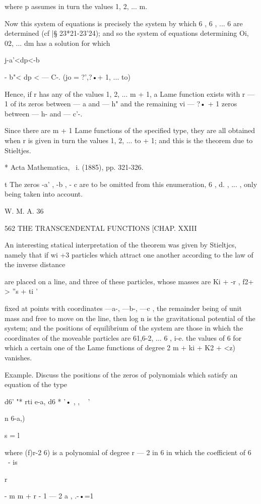 {{{{{{{where p assumes in turn the values 1, 2, ... m.

Now this system of equations is precisely the system by which 6 , 6 ,
... 6 are determined (cf |§ 23*21-23'24); and so the system of
equations determining Oi, 02, ... dm has a solution for which

j-a'<dp<-b%

 - b"< dp < — C-. (jo = ?',?•+ 1, ... to)

Hence, if r has any of the values 1, 2, ... m + 1, a Lame function
exists with r — 1 of its zeros between — a and — h" and the remaining
vi — ?• + 1 zeros between — h- and — c'-.

Since there are m + 1 Lame functions of the specified type, they are
all obtained when r is given in turn the values 1, 2, ... to + 1; and
this is the theorem due to Stieltjes.

* Acta Mathematica, \ i. (1885), pp. 321-326.

t The zeros -a' , -b , - c are to be omitted from this enumeration, 6
, d. , ... , only being taken into account.

W. M. A. 36

562 THE TRANSCENDENTAL FUNCTIONS [CHAP. XXIII

An interesting statical interpretation of the theorem was given by
Stieltjcs, namely that if wi +3 particles which attract one another
according to the law of the inverse distance

are placed on a line, and three of these particles, whose masses are
Ki + -r , f2+ > ''s + ti '

fixed at points with coordinates —a-, —b-, —c , the remainder being of
unit mass and free to move on the line, then log n is the
gravitational potential of the system; and the positions of
equilibrium of the system are those in which the coordinates of the
moveable particles are 61,6-2, ... 6 , i-e. the values of 6 for which
a certain one of the Lame functions of degree 2 m + ki + K2 + <z)
vanishes.

Example. Discuss the positions of the zeros of polynomials which
satisfy an equation of the type

d6' "* rti e-a, d6 * '• , , ~ '

n 6-a,)

s = l

where (f)r-2 6) is a polynomial of degree r — 2 in 6 in which the
coefficient of 6 ~- is

r

- m m + r - 1 — 2 a , .-•=1

}}}}}}}
